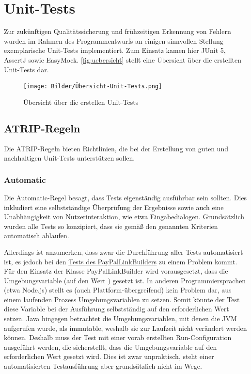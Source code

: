 \chapter{Unit-Tests}
Zur zukünftigen Qualitätssicherung und frühzeitigen Erkennung von Fehlern wurden im Rahmen des Programmentwurfs an einigen sinnvollen Stellung exemplarische Unit-Tests implementiert.
Zum Einsatz kamen hier JUnit 5, AssertJ sowie EasyMock.
\autoref{fig:uebersicht} stellt eine Übersicht über die erstellten Unit-Tests dar.

\begin{figure}[H]
    \centering
    \texttt{[image: Bilder/Übersicht-Unit-Tests.png]}
    \caption{Übersicht über die erstellen Unit-Tests}
    \label{fig:uebersicht}
\end{figure}

\section{ATRIP-Regeln}
Die ATRIP-Regeln bieten Richtlinien, die bei der Erstellung von guten und nachhaltigen Unit-Tests unterstützen sollen.

\subsection{Automatic}
\label{sec:automatic}
Die Automatic-Regel besagt, dass Tests eigenständig ausführbar sein sollten.
Dies inkludiert eine selbstständige Überprüfung der Ergebnisse sowie auch eine Unabhängigkeit von Nutzerinteraktion, wie etwa Eingabedialogen.
Grundsätzlich wurden alle Tests so konzipiert, dass sie gemäß den genannten Kriterien automatisch ablaufen.

Allerdings ist anzumerken, dass zwar die Durchführung aller Tests automatisiert ist, es jedoch bei den \href{https://github.com/yschiebelhut/carpool-java/blob/d0315b99dcd93e582ef60fddb185b7962bcb0076/0-carpool-java-integration/src/test/java/paypal/PayPalLinkBuilderTest.java}{Tests des PayPalLinkBuilders} zu einem Problem kommt.
Für den Einsatz der Klasse PayPalLinkBuilder wird vorausgesetzt, dass die Umgebungsvariable  (auf den Wert ) gesetzt ist.
In anderen Programmiersprachen (etwa Node.js) stellt es (auch Plattform-übergreifend) kein Problem dar, aus einem laufenden Prozess Umgebungsvariablen zu setzen.
Somit könnte der Test diese Variable bei der Ausführung selbstständig auf den erforderlichen Wert setzen.
Java hingegen betrachtet die Umgebungsvariablen, mit denen die JVM aufgerufen wurde, als immutable, weshalb sie zur Laufzeit nicht verändert werden können.
Deshalb muss der Test mit einer vorab erstellten Run-Configuration ausgeführt werden, die sicherstellt, dass die Umgebungsvariable auf den erforderlichen Wert gesetzt wird.
Dies ist zwar unpraktisch, steht einer automatisierten Testausführung aber grundsätzlich nicht im Wege.

